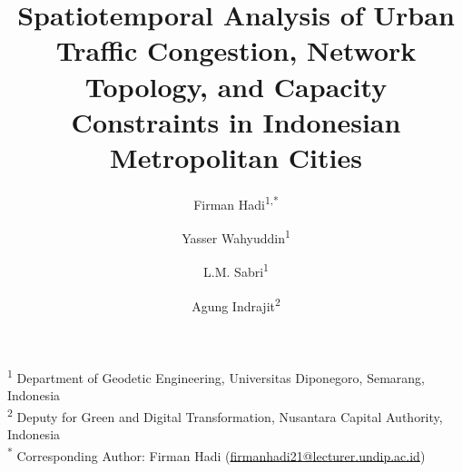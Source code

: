 \documentclass[12pt,a4paper]{article}
\title{Spatiotemporal Analysis of Urban Traffic Congestion, Network Topology, and Capacity Constraints in Indonesian Metropolitan Cities}
\author{%
  Firman Hadi\textsuperscript{1,*} \and
  Yasser Wahyuddin\textsuperscript{1} \and
  L.M. Sabri\textsuperscript{1} \and
  Agung Indrajit\textsuperscript{2}%
}
\date{}
\begin{document}
\maketitle

\noindent\textsuperscript{1} Department of Geodetic Engineering, Universitas Diponegoro, Semarang, Indonesia\\
\textsuperscript{2} Deputy for Green and Digital Transformation, Nusantara Capital Authority, Indonesia\\[6pt]
\textsuperscript{*} Corresponding Author: Firman Hadi (\href{firmanhadi21@lecturer.undip.ac.id}{firmanhadi21@lecturer.undip.ac.id})

\bigskip
\end{document}

